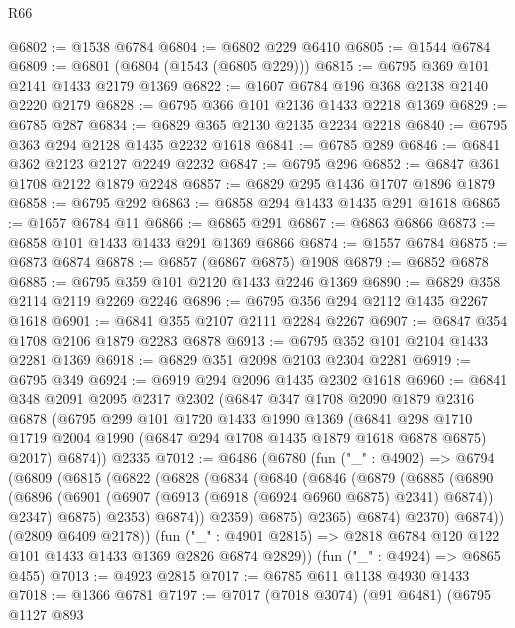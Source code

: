 \begin{lexlean}{R66}
\begin{coremodule}
@6802 := @1538 @6784
@6804 := @6802 @229 @6410
@6805 := @1544 @6784
@6809 := @6801 (@6804 (@1543 (@6805 @229)))
@6815 := @6795 @369 @101 @2141 @1433 @2179 @1369
@6822 := @1607 @6784 @196 @368 @2138 @2140 @2220 @2179
@6828 := @6795 @366 @101 @2136 @1433 @2218 @1369
@6829 := @6785 @287
@6834 := @6829 @365 @2130 @2135 @2234 @2218
@6840 := @6795 @363 @294 @2128 @1435 @2232 @1618
@6841 := @6785 @289
@6846 := @6841 @362 @2123 @2127 @2249 @2232
@6847 := @6795 @296
@6852 := @6847 @361 @1708 @2122 @1879 @2248
@6857 := @6829 @295 @1436 @1707 @1896 @1879
@6858 := @6795 @292
@6863 := @6858 @294 @1433 @1435 @291 @1618
@6865 := @1657 @6784 @11
@6866 := @6865 @291
@6867 := @6863 @6866
@6873 := @6858 @101 @1433 @1433 @291 @1369 @6866
@6874 := @1557 @6784
@6875 := @6873 @6874
@6878 := @6857 (@6867 @6875) @1908
@6879 := @6852 @6878
@6885 := @6795 @359 @101 @2120 @1433 @2246 @1369
@6890 := @6829 @358 @2114 @2119 @2269 @2246
@6896 := @6795 @356 @294 @2112 @1435 @2267 @1618
@6901 := @6841 @355 @2107 @2111 @2284 @2267
@6907 := @6847 @354 @1708 @2106 @1879 @2283 @6878
@6913 := @6795 @352 @101 @2104 @1433 @2281 @1369
@6918 := @6829 @351 @2098 @2103 @2304 @2281
@6919 := @6795 @349
@6924 := @6919 @294 @2096 @1435 @2302 @1618
@6960 := @6841
    @348
    @2091
    @2095
    @2317
    @2302
    (@6847
      @347
      @1708
      @2090
      @1879
      @2316
      @6878
      (@6795
        @299
        @101
        @1720
        @1433
        @1990
        @1369
        (@6841 @298 @1710 @1719 @2004 @1990 (@6847 @294 @1708 @1435 @1879 @1618 @6878 @6875) @2017)
        @6874))
    @2335
@7012 := @6486
    (@6780
      (fun ("_" : @4902) =>
      @6794
        (@6809
          (@6815
            (@6822
              (@6828
                (@6834
                  (@6840
                    (@6846
                      (@6879
                        (@6885
                          (@6890
                            (@6896
                              (@6901 (@6907 (@6913 (@6918 (@6924 @6960 @6875) @2341) @6874)) @2347)
                              @6875)
                            @2353)
                          @6874))
                      @2359)
                    @6875)
                  @2365)
                @6874)
              @2370)
            @6874))
        (@2809 @6409 @2178))
      (fun ("_" : @4901 @2815) => @2818 @6784 @120 @122 @101 @1433 @1433 @1369 @2826 @6874 @2829))
    (fun ("_" : @4924) => @6865 @455)
@7013 := @4923 @2815
@7017 := @6785 @611 @1138 @4930 @1433
@7018 := @1366 @6781
@7197 := @7017
    (@7018 @3074)
    (@91 @6481)
    (@6795
      @1127
      @893

\end{coremodule}
\end{lexlean}
